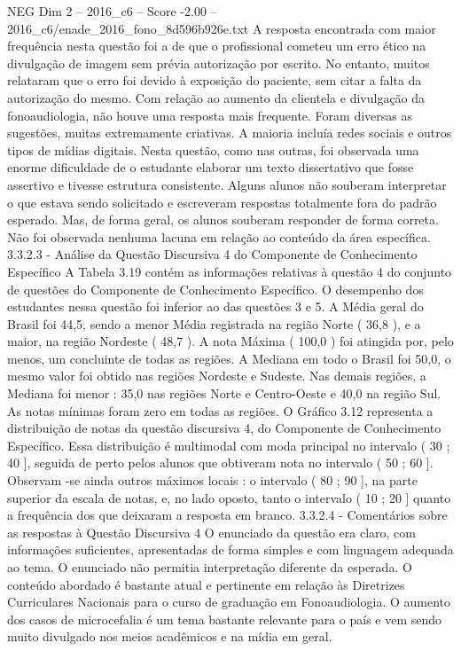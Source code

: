 \begin{textsample}{NEG Dim 2 – 2016\_c6 – Score -2.00 – 2016\_c6/enade\_2016\_fono\_8d596b926e.txt}
A resposta encontrada com maior frequência nesta questão foi a de que o profissional cometeu um erro ético na divulgação de imagem sem prévia autorização por escrito.
No entanto, muitos relataram que o erro foi devido à exposição do paciente, sem citar a falta da autorização do mesmo.
Com relação ao aumento da clientela e divulgação da fonoaudiologia, não houve uma resposta mais frequente.
Foram diversas as sugestões, muitas extremamente criativas.
A maioria incluía redes sociais e outros tipos de mídias digitais.
Nesta questão, como nas outras, foi observada uma enorme dificuldade de o estudante elaborar um texto dissertativo que fosse assertivo e tivesse estrutura consistente.
Alguns alunos não souberam interpretar o que estava sendo solicitado e escreveram respostas totalmente fora do padrão esperado.
Mas, de forma geral, os alunos souberam responder de forma correta.
Não foi observada nenhuma lacuna em relação ao conteúdo da área específica. 3.3.2.3 - Análise da Questão Discursiva 4 do Componente de Conhecimento Específico A Tabela 3.19 contém as informações relativas à questão 4 do conjunto de questões do Componente de Conhecimento Específico.
O desempenho dos estudantes nessa questão foi inferior ao das questões 3 e 5.
A Média geral do Brasil foi 44,5, sendo a menor Média registrada na região Norte ( 36,8 ), e a maior, na região Nordeste ( 48,7 ).
A nota Máxima ( 100,0 ) foi atingida por, pelo menos, um concluinte de todas as regiões.
A Mediana em todo o Brasil foi 50,0, o mesmo valor foi obtido nas regiões Nordeste e Sudeste.
Nas demais regiões, a Mediana foi menor : 35,0 nas regiões Norte e Centro-Oeste e 40,0 na região Sul.
As notas mínimas foram zero em todas as regiões.
O Gráfico 3.12 representa a distribuição de notas da questão discursiva 4, do Componente de Conhecimento Específico.
Essa distribuição é multimodal com moda principal no intervalo ( 30 ; 40 ], seguida de perto pelos alunos que obtiveram nota no intervalo ( 50 ; 60 ].
Observam -se ainda outros máximos locais : o intervalo ( 80 ; 90 ], na parte superior da escala de notas, e, no lado oposto, tanto o intervalo ( 10 ; 20 ] quanto a frequência dos que deixaram a resposta em branco. 3.3.2.4 - Comentários sobre as respostas à Questão Discursiva 4 O enunciado da questão era claro, com informações suficientes, apresentadas de forma simples e com linguagem adequada ao tema.
O enunciado não permitia interpretação diferente da esperada.
O conteúdo abordado é bastante atual e pertinente em relação às Diretrizes Curriculares Nacionais para o curso de graduação em Fonoaudiologia.
O aumento dos casos de microcefalia é um tema bastante relevante para o país e vem sendo muito divulgado nos meios acadêmicos e na mídia em geral.

\end{textsample}
